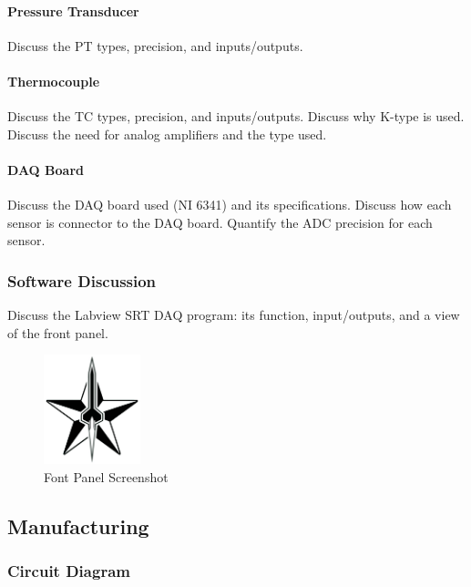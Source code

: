 \documentclass[10pt,a4paper]{article}
\begin{document}
\paragraph{Pressure Transducer}

Discuss the PT types, precision, and inputs/outputs. 

\paragraph{Thermocouple}

Discuss the TC types, precision, and inputs/outputs. Discuss why K-type is used. Discuss the need for analog amplifiers and the type used. 

\paragraph{DAQ Board}

Discuss the DAQ board used (NI 6341) and its specifications. Discuss how each sensor is connector to the DAQ board. Quantify the ADC precision for each sensor. 
	
\subsubsection{Software Discussion}

Discuss the Labview SRT DAQ program: its function, input/outputs, and a view of the front panel.  

\begin{figure}[h!]
	\centering
	\includegraphics[width=0.25\textwidth]{./figs/logo_srt.png}
	\caption{Font Panel Screenshot}
	\label{fig:example}
\end{figure}

\newpage
\subsection{Manufacturing}

\subsubsection{Circuit Diagram}
\end{document}
